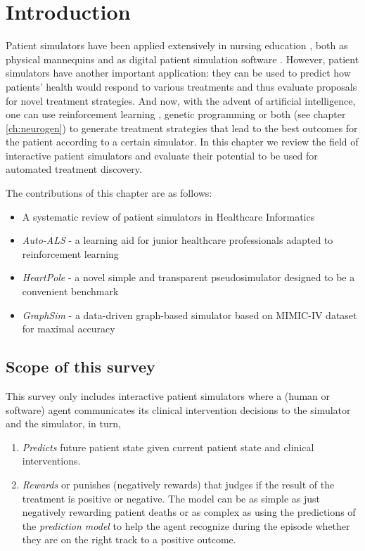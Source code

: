 \section{Introduction}
\label{sec:intro}

Patient simulators have been applied extensively in nursing education \cite{didactic-sims1,didactic-sims2,didactic-sims3}, both as physical mannequins and as digital patient simulation software \cite{didactic-virtual}.
However, patient simulators have another important application: they can be used to predict how patients' health would respond to various treatments and thus evaluate proposals for novel treatment strategies.
And now, with the advent of artificial intelligence, one can use reinforcement learning \cite{healthcare-rl}, genetic programming or both (see chapter \ref{ch:neurogen}) to generate treatment strategies that lead to the best outcomes for the patient according to a certain simulator.
In this chapter we review the field of interactive patient simulators and evaluate their potential to be used for automated treatment discovery.

The contributions of this chapter are as follows:
\begin{itemize}
    \item A systematic review of patient simulators in Healthcare Informatics 
    \item \emph{Auto-ALS} - a learning aid for junior healthcare professionals adapted to reinforcement learning 
    \item \emph{HeartPole} - a novel simple and transparent pseudosimulator designed to be a convenient benchmark
    \item \emph{GraphSim} - a data-driven graph-based simulator based on MIMIC-IV dataset \cite{mimic} for maximal accuracy
\end{itemize}

\subsection{Scope of this survey}
\label{sec:scope}

This survey only includes interactive patient simulators where a (human or software) agent communicates its clinical intervention decisions to the simulator and the simulator, in turn,
\begin{enumerate}
    \item \emph{Predicts} future patient state given current patient state and clinical interventions.
    \item \emph{Rewards} or punishes (negatively rewards) that judges if the result of the treatment is positive or negative. The model can be as simple as just negatively rewarding patient deaths or as complex as using the predictions of the \emph{prediction model} to help the agent recognize during the episode whether they are on the right track to a positive outcome.
\end{enumerate}

